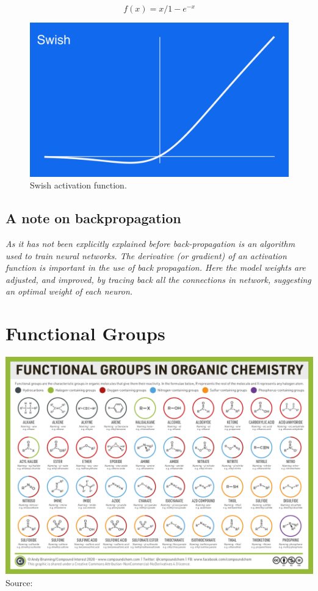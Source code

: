 \begin{appendices}
\begin{equation}
f(x) = x/1-e^{-x}
  \end{equation}
\begin{figure}[H]
\centering
\includegraphics[width=.265\textwidth]{4fig/swish.png}
\caption{Swish activation function.}
\end{figure}


\section{\textbf{A note on backpropagation}}
\emph{As it has not been explicitly explained before back-propagation is an algorithm used to train neural networks. The derivative (or gradient) of an activation function is important in the use of back propagation. Here the model weights are adjusted, and improved, by tracing back all the connections in network, suggesting an optimal weight of each neuron.}



\chapter{Functional Groups}\label{appendis:fngroups}
\includegraphics[width=.99\pageheight,angle=90]{4fig/fngroups.png}
Source:\cite{fgps}

\end{appendices}
